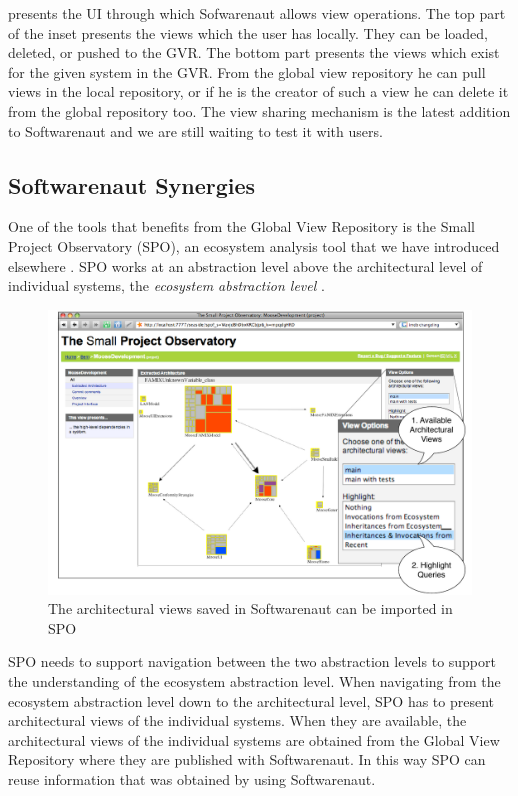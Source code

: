 \documentclass[preprint,12pt]{elsarticle}
\begin{document}
 presents the UI through which Sofwarenaut allows view operations. The top part of the inset presents the views which the user has locally. They can be loaded, deleted, or pushed to the GVR. The bottom part presents the views which exist for the given system in the GVR. From the global view repository he can pull views in the local repository, or if he is the creator of such a view he can delete it from the global repository too. The view sharing mechanism is the latest addition to Softwarenaut and we are still waiting to test it with users. 


\subsection {Softwarenaut Synergies}
One of the tools that benefits from the Global View Repository is the Small Project Observatory (SPO), an ecosystem analysis tool that we have introduced elsewhere \cite{lungu-est}. SPO works at an abstraction level above the architectural level of individual systems, the {\em ecosystem abstraction level} \cite{lungu-thesis}. 

\begin{figure}[th!]
\begin{center}
\includegraphics[width=0.7\linewidth]{images/SpoArchitectural}
\caption{The architectural views saved in Softwarenaut can be imported in SPO}
\label{}
\end{center}
\end{figure}


SPO needs to support navigation between the two abstraction levels to support the understanding of  the ecosystem abstraction level. When navigating from the ecosystem abstraction level down to the architectural level, SPO has to present architectural views of the individual systems. When they are available, the architectural views of the individual systems are obtained from the Global View Repository where they are published with Softwarenaut. In this way SPO can reuse information that was obtained by using Softwarenaut.
\end{document}
